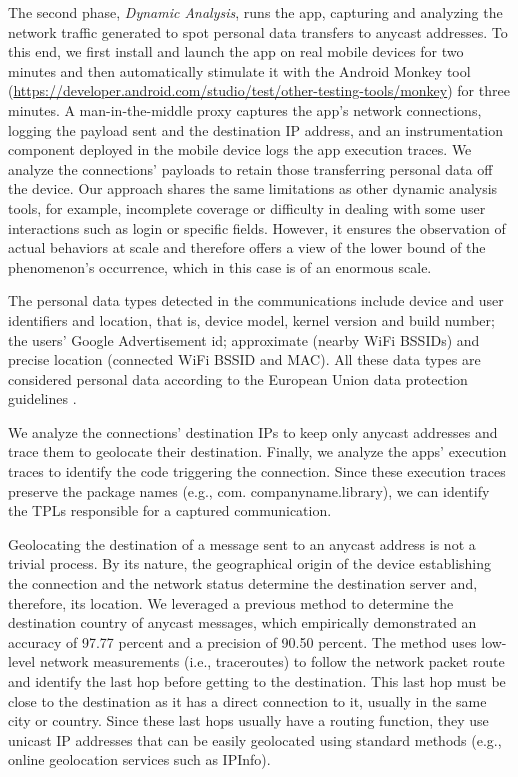 \documentclass{article}
\begin{document}
The second phase, \textit{Dynamic Analysis}, runs the app, capturing and analyzing the network traffic generated to spot personal data transfers to anycast addresses. To this end, we first install and launch the app on real mobile devices for two minutes and then automatically stimulate it with the Android Monkey tool (\url{https://developer.android.com/studio/test/other-testing-tools/monkey}) for three minutes. A man-in-the-middle proxy captures the app's network connections, logging the payload sent and the destination IP address, and an instrumentation component deployed in the mobile device logs the app execution traces. We analyze the connections' payloads to retain those transferring personal data off the device. Our approach shares the same limitations as other dynamic analysis tools, for example, incomplete coverage or difficulty in dealing with some user interactions such as login or specific fields. However, it ensures the observation of actual behaviors at scale and therefore offers a view of the lower bound of the phenomenon's occurrence, which in this case is of an enormous scale.

The personal data types detected in the communications include device and user identifiers and location, that is, device model, kernel version and build number; the users' Google Advertisement id; approximate (nearby WiFi BSSIDs) and precise location (connected WiFi BSSID and MAC). All these data types are considered personal data according to the European Union data protection guidelines \cite{JUSTICEwp260rev.01}.

We analyze the connections' destination IPs to keep only anycast addresses and trace them to geolocate their destination. Finally, we analyze the apps' execution traces to identify the code triggering the connection. Since these execution traces preserve the package names (e.g., com. companyname.library), we can identify the TPLs responsible for a captured communication.

Geolocating the destination of a message sent to an anycast address is not a trivial process. By its nature, the geographical origin of the device establishing the connection and the network status determine the destination server and, therefore, its location. We leveraged a previous method \cite{Pascual2024Hunter:Transfers} to determine the destination country of anycast messages, which empirically demonstrated an accuracy of 97.77 percent and a precision of 90.50 percent. The method uses low-level network measurements (i.e., traceroutes) to follow the network packet route and identify the last hop before getting to the destination. This last hop must be close to the destination as it has a direct connection to it, usually in the same city or country. Since these last hops usually have a routing function, they use unicast IP addresses that can be easily geolocated using standard methods (e.g., online geolocation services such as IPInfo).
\end{document}
